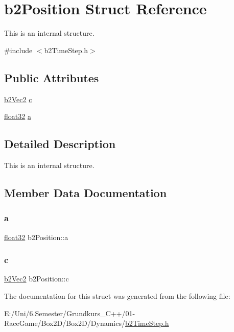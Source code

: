 \hypertarget{structb2_position}{}\section{b2\+Position Struct Reference}
\label{structb2_position}


This is an internal structure.  




{\ttfamily \#include $<$b2\+Time\+Step.\+h$>$}

\subsection*{Public Attributes}
\begin{DoxyCompactItemize}
\item 
\mbox{\hyperlink{structb2_vec2}{b2\+Vec2}} \mbox{\hyperlink{structb2_position_a64b6d764d272385f84e4cac5ceb5af27}{c}}
\item 
\mbox{\hyperlink{b2_settings_8h_aacdc525d6f7bddb3ae95d5c311bd06a1}{float32}} \mbox{\hyperlink{structb2_position_a19d9362011e8c080059ac7f692cc7d8f}{a}}
\end{DoxyCompactItemize}


\subsection{Detailed Description}
This is an internal structure. 

\subsection{Member Data Documentation}
\mbox{\label{structb2_position_a19d9362011e8c080059ac7f692cc7d8f}} 
\subsubsection{\texorpdfstring{a}{a}}
{\footnotesize\ttfamily \mbox{\hyperlink{b2_settings_8h_aacdc525d6f7bddb3ae95d5c311bd06a1}{float32}} b2\+Position\+::a}

\mbox{\label{structb2_position_a64b6d764d272385f84e4cac5ceb5af27}} 
\subsubsection{\texorpdfstring{c}{c}}
{\footnotesize\ttfamily \mbox{\hyperlink{structb2_vec2}{b2\+Vec2}} b2\+Position\+::c}



The documentation for this struct was generated from the following file\+:\begin{DoxyCompactItemize}
\item 
E\+:/\+Uni/6.\+Semester/\+Grundkurs\+\_\+\+C++/01-\/\+Race\+Game/\+Box2\+D/\+Box2\+D/\+Dynamics/\mbox{\hyperlink{b2_time_step_8h}{b2\+Time\+Step.\+h}}\end{DoxyCompactItemize}
